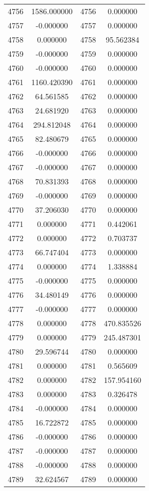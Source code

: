 \documentclass[12pt]{article}
\begin{document}
\begin{longtable}{@{}cccc@{}}
4756 & 1586.000000 & 4756 & 0.000000 \\
4757 & -0.000000 & 4757 & 0.000000 \\
4758 & 0.000000 & 4758 & 95.562384 \\
4759 & -0.000000 & 4759 & 0.000000 \\
4760 & -0.000000 & 4760 & 0.000000 \\
4761 & 1160.420390 & 4761 & 0.000000 \\
4762 & 64.561585 & 4762 & 0.000000 \\
4763 & 24.681920 & 4763 & 0.000000 \\
4764 & 294.812048 & 4764 & 0.000000 \\
4765 & 82.480679 & 4765 & 0.000000 \\
4766 & -0.000000 & 4766 & 0.000000 \\
4767 & -0.000000 & 4767 & 0.000000 \\
4768 & 70.831393 & 4768 & 0.000000 \\
4769 & -0.000000 & 4769 & 0.000000 \\
4770 & 37.206030 & 4770 & 0.000000 \\
4771 & 0.000000 & 4771 & 0.442061 \\
4772 & 0.000000 & 4772 & 0.703737 \\
4773 & 66.747404 & 4773 & 0.000000 \\
4774 & 0.000000 & 4774 & 1.338884 \\
4775 & -0.000000 & 4775 & 0.000000 \\
4776 & 34.480149 & 4776 & 0.000000 \\
4777 & -0.000000 & 4777 & 0.000000 \\
4778 & 0.000000 & 4778 & 470.835526 \\
4779 & 0.000000 & 4779 & 245.487301 \\
4780 & 29.596744 & 4780 & 0.000000 \\
4781 & 0.000000 & 4781 & 0.565609 \\
4782 & 0.000000 & 4782 & 157.954160 \\
4783 & 0.000000 & 4783 & 0.326478 \\
4784 & -0.000000 & 4784 & 0.000000 \\
4785 & 16.722872 & 4785 & 0.000000 \\
4786 & -0.000000 & 4786 & 0.000000 \\
4787 & -0.000000 & 4787 & 0.000000 \\
4788 & -0.000000 & 4788 & 0.000000 \\
4789 & 32.624567 & 4789 & 0.000000 \\

\end{longtable}
\end{document}
